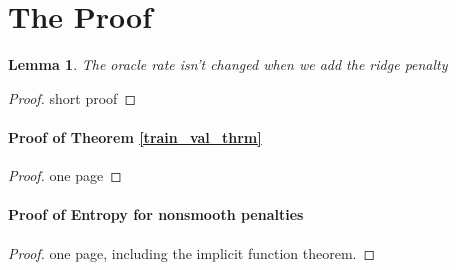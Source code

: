 \documentclass[12pt]{article}
\newtheorem{lemma}{Lemma}
\begin{document}
\section{The Proof} \label{sec:proofs}

\begin{lemma}
The oracle rate isn't changed when we add the ridge penalty
\end{lemma}
\begin{proof}
short proof
\end{proof}

\paragraph{Proof of Theorem \ref{train_val_thrm}}
\begin{proof}
one page
\end{proof}

\paragraph{Proof of Entropy for nonsmooth penalties}
\begin{proof}
one page, including the implicit function theorem.
\end{proof}
\end{document}
